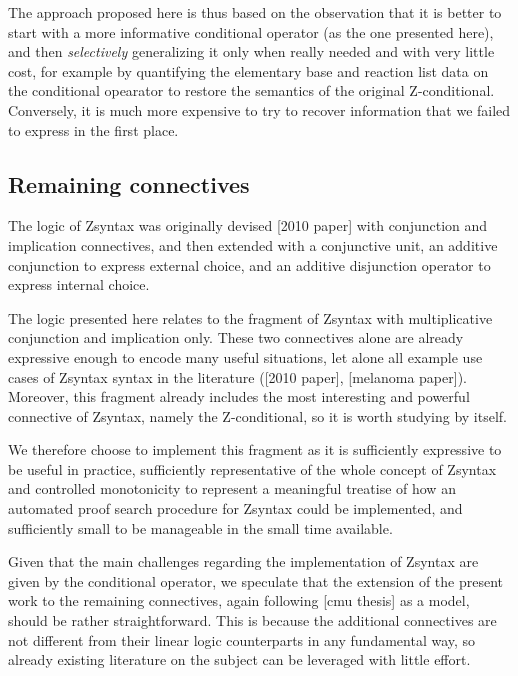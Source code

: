 The approach proposed here is thus based on the observation that it is better to
start with a more informative conditional operator (as the one presented here),
and then \emph{selectively} generalizing it only when really needed and with
very little cost, for example by quantifying the elementary base and reaction
list data on the conditional opearator to restore the semantics of the original
Z-conditional. Conversely, it is much more expensive to try to recover
information that we failed to express in the first place.

\subsection{Remaining connectives}

The logic of Zsyntax was originally devised [2010 paper] with conjunction and
implication connectives, and then extended \cite{adding-logic} with a
conjunctive unit, an additive conjunction to express external choice, and an
additive disjunction operator to express internal choice.

The logic presented here relates to the fragment of Zsyntax with multiplicative
conjunction and implication only. These two connectives alone are already
expressive enough to encode many useful situations, let alone all example use
cases of Zsyntax syntax in the literature ([2010 paper], [melanoma
paper]). Moreover, this fragment already includes the most interesting and
powerful connective of Zsyntax, namely the Z-conditional, so it is worth
studying by itself.

We therefore choose to implement this fragment as it is sufficiently expressive
to be useful in practice, sufficiently representative of the whole concept of
Zsyntax and controlled monotonicity to represent a meaningful treatise of how an
automated proof search procedure for Zsyntax could be implemented, and
sufficiently small to be manageable in the small time available.

Given that the main challenges regarding the implementation of Zsyntax are given
by the conditional operator, we speculate that the extension of the present work
to the remaining connectives, again following [cmu thesis] as a model, should be
rather straightforward. This is because the additional connectives are not
different from their linear logic counterparts in any fundamental way, so
already existing literature on the subject can be leveraged with little effort.

